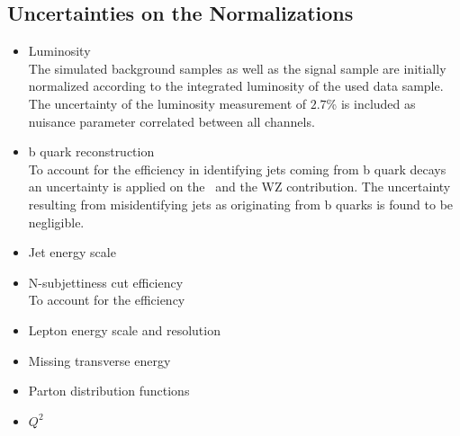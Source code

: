 \subsection*{Uncertainties on the Normalizations}
\begin{itemize}
\item Luminosity\\
The simulated background samples as well as the signal sample are initially normalized according to the integrated luminosity of the used data sample. The uncertainty of the luminosity measurement of $2.7$\% is included as nuisance parameter correlated between all channels.
\item b quark reconstruction\\
To account for the efficiency in identifying jets coming from b quark decays \cite{CSV2} an uncertainty is applied on the \ttbar \ and the WZ contribution. The uncertainty resulting from misidentifying jets as originating from b quarks is found to be negligible.
\item Jet energy scale\\

\item N-subjettiness cut efficiency\\
To account for the efficiency 
\item Lepton energy scale and resolution\\
\item Missing transverse energy\\

\item Parton distribution functions\\
\item $Q^2$\\
\end{itemize}
